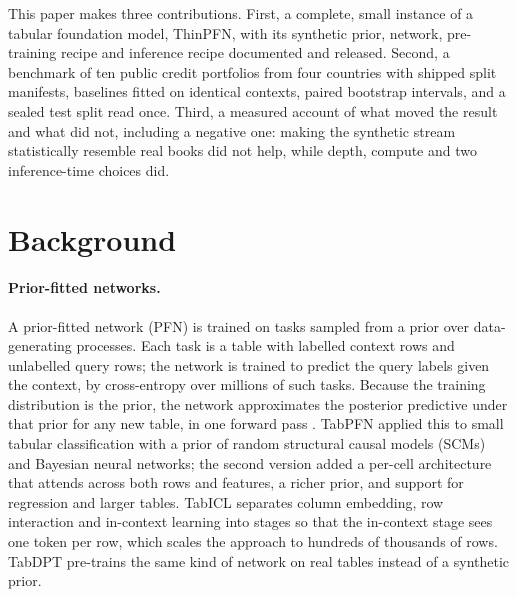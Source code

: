 \documentclass[twocolumn,10pt]{article}
\begin{document}
This paper makes three contributions. First, a complete, small instance of a tabular foundation model, ThinPFN, with
its synthetic prior, network, pre-training recipe and inference recipe documented and released. Second, a benchmark of
ten public credit portfolios from four countries with shipped split manifests, baselines fitted on identical contexts,
paired bootstrap intervals, and a sealed test split read once. Third, a measured account of what moved the result and
what did not, including a negative one: making the synthetic stream statistically resemble real books did not help,
while depth, compute and two inference-time choices did.

\section{Background}

\paragraph{Prior-fitted networks.} A prior-fitted network (PFN) is trained on tasks sampled from a prior over
data-generating processes. Each task is a table with labelled context rows and unlabelled query rows; the network is
trained to predict the query labels given the context, by cross-entropy over millions of such tasks. Because the
training distribution is the prior, the network approximates the posterior predictive under that prior for any new
table, in one forward pass \citep{muller2022transformers}. TabPFN \citep{hollmann2023tabpfn} applied this to small
tabular classification with a prior of random structural causal models (SCMs) and Bayesian neural networks; the second
version \citep{hollmann2025accurate} added a per-cell architecture that attends across both rows and features, a richer
prior, and support for regression and larger tables. TabICL \citep{qu2025tabicl} separates column embedding, row
interaction and in-context learning into stages so that the in-context stage sees one token per row, which scales the
approach to hundreds of thousands of rows. TabDPT \citep{ma2025tabdpt} pre-trains the same kind of network on real
tables instead of a synthetic prior.
\end{document}
